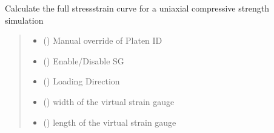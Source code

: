 \documentclass[letterpaper,10pt,english]{sphinxmanual}
\begin{document}
\begin{fulllineitems}
\begin{fulllineitems}
\label{\detokenize{openfdem:openfdem.openfdem.Model.complete_UCS_stress_strain}}
\pysigstartsignatures
{}
\pysigstopsignatures
\sphinxAtStartPar
Calculate the full stress\sphinxhyphen{}strain curve for a uniaxial compressive strength simulation
\begin{quote}\begin{description}
\begin{itemize}
\item {} 
\sphinxAtStartPar
{} () \textendash{} Manual override of Platen ID

\item {} 
\sphinxAtStartPar
{} () \textendash{} Enable/Disable SG

\item {} 
\sphinxAtStartPar
{} () \textendash{} Loading Direction

\item {} 
\sphinxAtStartPar
{} () \textendash{} width of the virtual strain gauge

\item {} 
\sphinxAtStartPar
{} () \textendash{} length of the virtual strain gauge


\end{itemize}
\end{description}
\end{quote}
\end{fulllineitems}
\end{fulllineitems}
\end{document}
